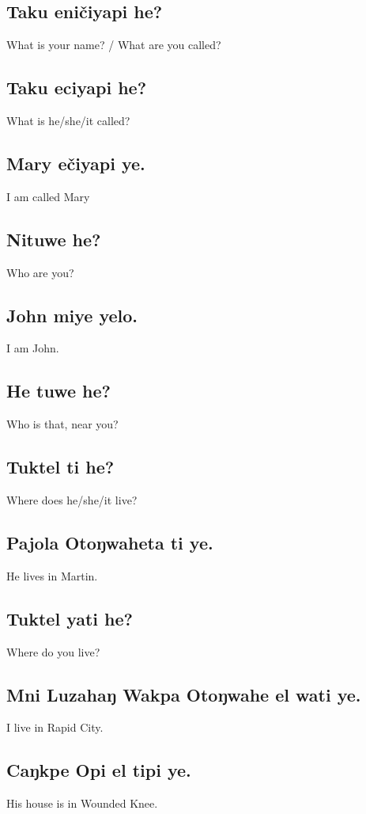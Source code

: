 \documentclass[11pt, letterpaper]{article}
\begin{document}
\subsection{Taku eničiyapi he?}
What is your name? / What are you called?
\subsection{Taku eciyapi he?}
What is he/she/it called?
\subsection{Mary ečiyapi ye.}
I am called Mary
\subsection{Nituwe he?}
Who are you?
\subsection{John miye yelo.}
I am John.
\subsection{He tuwe he?}
Who is that, near you?
\subsection{Tuktel ti he?}
Where does he/she/it live?
\subsection{Pajola Otoŋwaheta ti ye.}
He lives in Martin.
\subsection{Tuktel yati he?}
Where do you live?
\subsection{Mni Luzahaŋ Wakpa Otoŋwahe el wati ye.}
I live in Rapid City.
\subsection{Caŋkpe Opi el tipi ye.}
His house is in Wounded Knee.
\subsection{}
\end{document}
